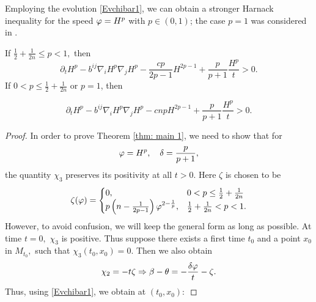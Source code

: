 \documentclass{amsart}
\begin{document}
Employing the evolution \cref{Evchibar1}, we can obtain a stronger Harnack inequality for the speed \(\varphi = H^{p}\) with \(p \in (0,1)\); the case $p=1$ was considered in \cite{2015arXiv150802821B}.
\begin{theorem}\label{thm: main 1}
If $\frac{1}{2}+\frac{1}{2n}\leq {p}< 1,$ then
\[
\partial_t H^{p} - b^{ij}\nabla_iH^{p}\nabla_jH^{p} - \frac{c {p}}{2{p}-1}H^{2{p}-1} + \frac{{p}}{{p}+1} \frac{H^{p}}{t} > 0.
\]
If $0<{p}\leq \frac{1}{2} + \frac{1}{2n}$ or $p=1$, then

\[
\partial_t H^{p} - b^{ij}\nabla_iH^{p}\nabla_jH^{p} - c n{p}H^{2{p}-1} + \frac{{p}}{{p}+1} \frac{H^{p}}{t} > 0.
\]
\end{theorem}
\begin{proof}
In order to prove Theorem \ref{thm: main 1}, we need to show that for
$$\varphi=H^{p},\quad \delta=\frac{p}{p+1},$$
the quantity $\chi_3$ preserves its positivity at all $t>0.$ Here $\zeta$ is chosen to be
$$\zeta(\varphi)=\begin{cases} 0, &0<p\leq \frac{1}{2}+\frac{1}{2n}\\
                    p\left(n-\frac{1}{2p-1}\right)\varphi^{2-\frac{1}{p}}, &\frac{1}{2}+\frac{1}{2n}<p< 1.\end{cases}$$
However, to avoid confusion, we will keep the general form as long as possible.
At time $t=0,$ $\chi_3$ is positive.
Thus suppose there exists a first time $t_0$ and a point $x_0$ in $M_{t_0},$ such that $\chi_3(t_0,x_0)=0.$
Then we also obtain
$$\chi_2=-t\zeta\Rightarrow \beta-\theta=-\frac{\delta\varphi}{t}-\zeta.$$
Thus, using \eqref{Evchibar1}, we obtain at $(t_0,x_0):$


\end{proof}
\end{document}
